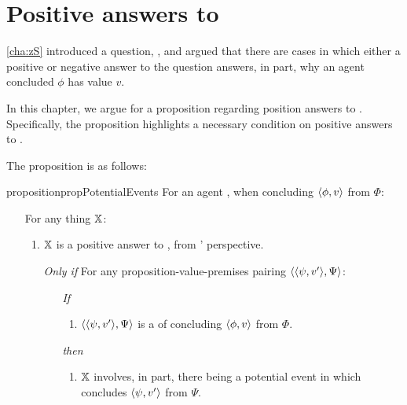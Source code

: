 \chapter{Positive answers to \qzS{}}
\label{cha:zSpA}

\nocite{Scriven:1962vq}
\nocite{Woodward:2021ue}
\nocite{Perry:1979vc}
\nocite{Perry:1986aa}

\begin{note}
  \autoref{cha:zS} introduced a question, \qzS{}, and argued that there are cases in which either a positive or negative answer to the question answers, in part, why an agent concluded \(\phi\) has value \(v\).

  In this chapter, we argue for a proposition regarding position answers to \qzS{}.
  Specifically, the proposition highlights a necessary condition on positive answers to \qzS{}.

  The proposition is as follows:

  \begin{restatable}{proposition}{propPotentialEvents}
    \label{prop:PWEs}
    For an agent \vAgent{}, when concluding \(\pv{\phi}{v}\) from \(\Phi\):

    \begin{itemize}
    \item[]
      For any thing \(\qzSaV{}\):
      \begin{enumerate}[label=\alph*., ref=(\alph*)]
      \item
        \label{prop:PWEs:a}
        \(\qzSaV{}\) is a positive answer to \qzS{}, from \vAgent{}' perspective.
      \end{enumerate}
      \begin{itemize}
      \item[\emph{Only if}]
        For any proposition-value-premises pairing \(\pvp{\psi}{v'}{\Psi}\):
        \begin{itemize}
        \item[\emph{If}]
          \begin{enumerate}[label=\alph*., ref=(\alph*), resume]
          \item
            \label{prop:PWEs:b}
            \(\pvp{\psi}{v'}{\Psi}\) is a \requ{} of \vAgent{} concluding \(\pv{\phi}{v}\) from \(\Phi\).
          \end{enumerate}
        \item[\emph{then}]
          \begin{enumerate}[label=\alph*., ref=(\alph*), resume]
          \item
            \label{prop:PWEs:c}
            \(\qzSaV{}\) involves, in part, there being a potential event in which \vAgent{} concludes \(\pv{\psi}{v'}\) from \(\Psi\).
          \end{enumerate}
        \end{itemize}
      \end{itemize}
    \end{itemize}
    \vspace{-\baselineskip}
  \end{restatable}
\end{note}

